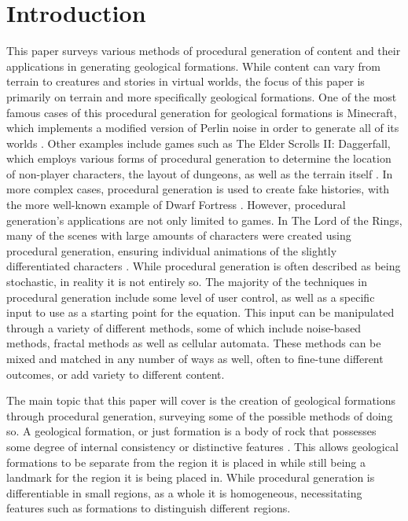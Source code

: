 \documentclass[10pt]{report}
\begin{document}
	\clearpage
	
	\tableofcontents
	
	\clearpage
	
	\let\clearpage\relax
	\chapter{Introduction}
	
		This paper surveys various methods of procedural generation of content and their applications in generating geological formations. While content can vary from terrain to creatures and stories in virtual worlds, the focus of this paper is primarily on terrain and more specifically geological formations. One of the most famous cases of this procedural generation for geological formations is Minecraft, which implements a modified version of Perlin noise in order to generate all of its worlds \cite{minecraft-gen}. Other examples include games such as The Elder Scrolls II: Daggerfall, which employs various forms of procedural generation to determine the location of non-player characters, the layout of dungeons, as well as the terrain itself \cite{daggerfall}. In more complex cases, procedural generation is used to create fake histories, with the more well-known example of Dwarf Fortress \cite{df-dev}. However, procedural generation's applications are not only limited to games. In The Lord of the Rings, many of the scenes with large amounts of characters were created using procedural generation, ensuring individual animations of the slightly differentiated characters \cite{massive}. While procedural generation is often described as being stochastic, in reality it is not entirely so. The majority of the techniques in procedural generation include some level of user control, as well as a specific input to use as a starting point for the equation. This input can be manipulated through a variety of different methods, some of which include noise-based methods, fractal methods as well as cellular automata. These methods can be mixed and matched in any number of ways as well, often to fine-tune different outcomes, or add variety to different content.
		
		The main topic that this paper will cover is the creation of geological formations through procedural generation, surveying some of the possible methods of doing so. A geological formation, or just formation is a body of rock that possesses some degree of internal consistency or distinctive features \cite{2005}. This allows geological formations to be separate from the region it is placed in while still being a landmark for the region it is being placed in. While procedural generation is differentiable in small regions, as a whole it is homogeneous, necessitating features such as formations to distinguish different regions. 
		
\end{document}

